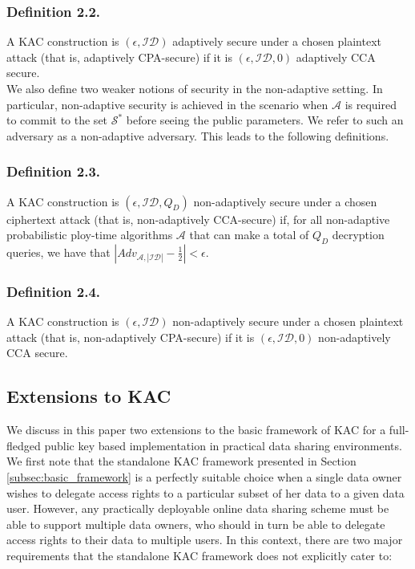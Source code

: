 \subsubsection{Definition 2.2.}
 A KAC construction is $(\epsilon,\mathcal{ID})$ adaptively secure under a chosen plaintext attack (that is, adaptively CPA-secure) if it is $(\epsilon,\mathcal{ID},0)$ adaptively CCA secure.\\


\noindent We also define two weaker notions of security in the non-adaptive setting. In particular, non-adaptive security is achieved in the scenario when $\mathcal{A}$ is required to commit to the set ${\mathcal{S}}^{*}$ before seeing the public parameters. We refer to such an adversary as a non-adaptive adversary. This leads to the following definitions.

\subsubsection{Definition 2.3.}
 A KAC construction is $(\epsilon,\mathcal{ID},Q_D)$ non-adaptively secure under a chosen ciphertext attack (that is, non-adaptively CCA-secure) if, for all non-adaptive probabilistic ploy-time algorithms $\mathcal{A}$ that can make a total of $Q_D$ decryption queries, we have that $|Adv_{\mathcal{A},|\mathcal{ID}|}-\frac{1}{2}| < \epsilon$.

\subsubsection{Definition 2.4.}
 A KAC construction is $(\epsilon,\mathcal{ID})$ non-adaptively secure under a chosen plaintext attack (that is, non-adaptively CPA-secure) if it is $(\epsilon,\mathcal{ID},0)$ non-adaptively CCA secure.

\subsection{Extensions to KAC}
\label{subsec:extensions}

We discuss in this paper two extensions to the basic framework of KAC for a full-fledged public key based implementation in practical data sharing environments. We first note that the standalone KAC framework presented in Section \ref{subsec:basic_framework} is a perfectly suitable choice when a single data owner wishes to delegate access rights to a particular subset of her data to a given data user. However, any practically deployable online data sharing scheme must be able to support multiple data owners, who should in turn be able to delegate access rights to their data to multiple users. In this context, there are two major requirements that the standalone KAC framework does not explicitly cater to:

